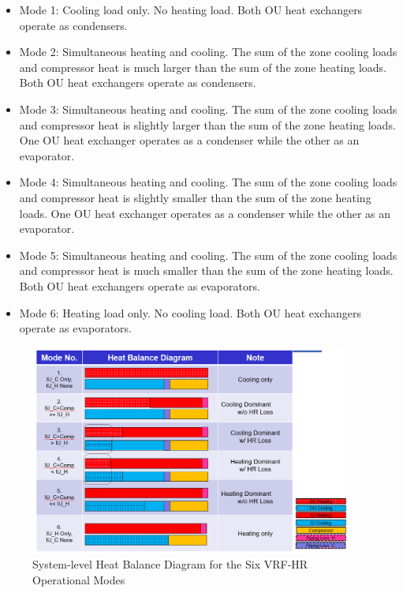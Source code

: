 \begin{itemize}
  \item
  Mode 1: Cooling load only. No heating load. Both OU heat exchangers operate as condensers.
  \item
  Mode 2: Simultaneous heating and cooling. The sum of the zone cooling loads and compressor heat is much larger than the sum of the zone heating loads. Both OU heat exchangers operate as condensers.
  \item
  Mode 3: Simultaneous heating and cooling. The sum of the zone cooling loads and compressor heat is slightly larger than the sum of the zone heating loads. One OU heat exchanger operates as a condenser while the other as an evaporator.
  \item
  Mode 4: Simultaneous heating and cooling. The sum of the zone cooling loads and compressor heat is slightly smaller than the sum of the zone heating loads. One OU heat exchanger operates as a condenser while the other as an evaporator.
  \item
  Mode 5: Simultaneous heating and cooling. The sum of the zone cooling loads and compressor heat is much smaller than the sum of the zone heating loads. Both OU heat exchangers operate as evaporators.
  \item
  Mode 6: Heating load only. No cooling load. Both OU heat exchangers operate as evaporators.
\end{itemize}

\begin{figure}[hbtp] %
\centering
\includegraphics[width=0.95\textwidth, height=0.95\textheight, keepaspectratio=true]{media/VRF-HR-Chart-HeatBalance.png}
\caption{System-level Heat Balance Diagram for the Six VRF-HR Operational Modes \label{fig:VRF-HR-Chart-HeatBalance}}
\end{figure}

